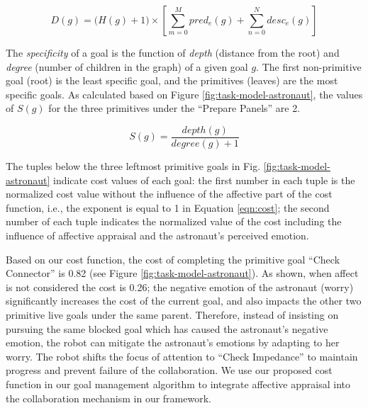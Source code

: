 \documentclass[12pt]{report}
\begin{document}
\begin{equation}
D(g) = \Big(H(g)+1\Big)\times\left[\sum\limits_{m=0}^{M} pred_e(g) +
\sum\limits_{n=0}^{N} desc_e(g)\right]
\label{eqn:difficulty}
\end{equation}

The \textit{specificity} of a goal is the function of \textit{depth} (distance
from the root) and \textit{degree} (number of children in the graph) of a given
goal $g$. The first non-primitive goal (root) is the least specific goal, and
the primitives (leaves) are the most specific goals. As calculated based on
Figure \ref{fig:task-model-astronaut}, the values of $S(g)$ for the three
primitives under the ``Prepare Panels'' are 2.

\begin{equation}
S(g) = \frac{depth(g)}{degree(g)+1}
\label{eqn:specificity}
\end{equation}

The tuples below the three leftmost primitive goals in Fig.
\ref{fig:task-model-astronaut} indicate cost values of each goal: the first
number in each tuple is the normalized cost value without the influence of the
affective part of the cost function, i.e., the exponent is equal to 1 in
Equation \ref{eqn:cost}; the second number of each tuple indicates the
normalized value of the cost including the influence of affective appraisal and
the astronaut's perceived emotion.

Based on our cost function, the cost of completing the primitive goal ``Check
Connector'' is 0.82 (see Figure \ref{fig:task-model-astronaut}). As shown, when
affect is not considered the cost is 0.26; the negative emotion of the astronaut
(worry) significantly increases the cost of the current goal, and also impacts
the other two primitive live goals under the same parent. Therefore, instead of
insisting on pursuing the same blocked goal which has caused the astronaut's
negative emotion, the robot can mitigate the astronaut's emotions by adapting to
her worry. The robot shifts the focus of attention to ``Check Impedance'' to
maintain progress and prevent failure of the collaboration. We use our proposed
cost function in our goal management algorithm to integrate affective appraisal
into the collaboration mechanism in our framework.
\end{document}
